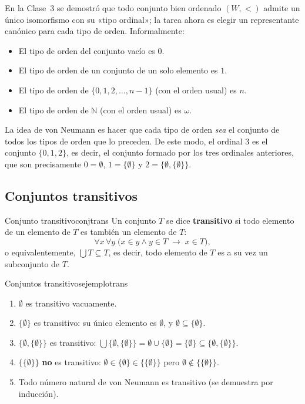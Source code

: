 En la Clase~3 se demostró que todo conjunto bien ordenado $(W, <)$ admite un único isomorfismo con su «tipo ordinal»; la tarea ahora es elegir un representante canónico para cada tipo de orden. Informalmente:

\begin{itemize}[leftmargin=2em]
  \item El tipo de orden del conjunto vacío es $0$.
  \item El tipo de orden de un conjunto de un solo elemento es $1$.
  \item El tipo de orden de $\{0, 1, 2, \ldots, n-1\}$ (con el orden usual) es $n$.
  \item El tipo de orden de $\mathbb{N}$ (con el orden usual) es $\omega$.
\end{itemize}

La idea de von Neumann es hacer que cada tipo de orden \emph{sea} el conjunto de todos los tipos de orden que lo preceden. De este modo, el ordinal $3$ es el conjunto $\{0, 1, 2\}$, es decir, el conjunto formado por los tres ordinales anteriores, que son precisamente $0 = \emptyset$, $1 = \{\emptyset\}$ y $2 = \{\emptyset, \{\emptyset\}\}$.

\subsection{Conjuntos transitivos}

\begin{definicion}{Conjunto transitivo}{conjtrans}
Un conjunto $T$ se dice \textbf{transitivo} si todo elemento de un elemento de $T$ es también un elemento de $T$:
\[
  \forall x\,\forall y\;\bigl(x \in y \wedge y \in T \;\to\; x \in T\bigr),
\]
o equivalentemente, $\bigcup T \subseteq T$, es decir, todo elemento de $T$ es a su vez un subconjunto de $T$.
\end{definicion}

\begin{ejemplo}{Conjuntos transitivos}{ejemplotrans}
\begin{enumerate}[leftmargin=2em, label=(\alph*)]
  \item $\emptyset$ es transitivo vacuamente.
  \item $\{\emptyset\}$ es transitivo: su único elemento es $\emptyset$, y $\emptyset \subseteq \{\emptyset\}$.
  \item $\{\emptyset, \{\emptyset\}\}$ es transitivo: $\bigcup\{\emptyset,\{\emptyset\}\} = \emptyset \cup \{\emptyset\} = \{\emptyset\} \subseteq \{\emptyset, \{\emptyset\}\}$.
  \item $\{\{\emptyset\}\}$ \textbf{no} es transitivo: $\emptyset \in \{\emptyset\} \in \{\{\emptyset\}\}$ pero $\emptyset \notin \{\{\emptyset\}\}$.
  \item Todo número natural de von Neumann es transitivo (se demuestra por inducción).
\end{enumerate}
\end{ejemplo}

